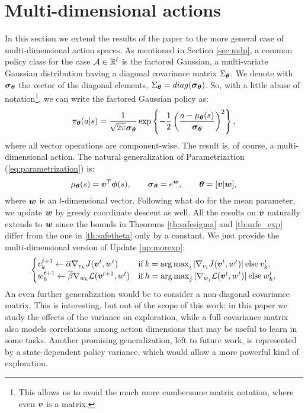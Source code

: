 \chapter{Multi-dimensional actions}\label{app:multi}
In this section we extend the results of the paper to the more general case of multi-dimensional action spaces.
As mentioned in Section \ref{sec:mdp}, a common policy class for the case $\Aspace\in\mathbb{R}^l$ is the factored Gaussian, \ie a multi-variate Gaussian distribution having a diagonal covariance matrix $\Sigma_{\vtheta}$. We denote with $\vsigma_{\vtheta}$ the vector of the diagonal elements, \ie $\Sigma_{\vtheta} = \mathop{diag}(\vsigma_{\vtheta})$. So, with a little abuse of notation\footnote{This allows us to avoid the much more cumbersome matrix notation, where even $\vv$ is a matrix.}, we can write the factored Gaussian policy as:
\[
\pi_{\vtheta}(a\vert s) = \frac{1}{\sqrt{2\pi}\vsigma_{\vtheta}}\exp\left\{-\frac{1}{2}\left(\frac{a - \mu_{\vtheta}(s)}{\vsigma_{\vtheta}}\right)^2\right\},
\]
where all vector operations are component-wise. The result is, of course, a multi-dimensional action. The natural generalization of Parametrization (\ref{eq:parametrization}) is:
\begin{align}\label{eq:parametrization_multi}
\mu_{\vtheta}(s)=\vv^T\vphi(s), \qquad \vsigma_{\vtheta}=e^{\vw}, \qquad \vtheta=[\vv\vert \vw],
\end{align}
where $\vw$ is an $l$-dimensional vector. Following what \cite{adaptive_batch} do for the mean parameter, we update $\vw$ by greedy coordinate descent as well. All the results on $\vv$ naturally extends to $\vw$ since the bounds in Theorems \ref{th:safesigma} and \ref{th:safe_exp} differ from the one in \ref{th:safetheta} only by a constant. We just provide the multi-dimensional version of Update \ref{up:morexp}:
\begin{align*}
\begin{cases}
v_{k}^{t+1} \gets \overline{\alpha}\gradJ[v_{k}]{\vv^t,w^t}
& \text{if}\:k =  \argmax_i |\gradJ[v_i]{\vv^t, w^t}| \:\text{else}\:v_{k}^t,\\
w_h^{t+1} \gets \overline{\beta}\nabla_{w_h}\mathcal{L}(\vv^{t+1}, w^t)
& \text{if}\:h =  \argmax_j |\nabla_{w_j}\mathcal{L}(\vv^t, w^t)| \:\text{else}\:w_{h}^t.
\end{cases}
\end{align*}
An even further generalization would be to consider a non-diagonal covariance matrix. This is interesting, but out of the scope of this work: in this paper we study the effects of the variance on exploration, while a full covariance matrix also models correlations among action dimensions that may be useful to learn in some tasks.
Another promising generalization, left to future work, is represented by a state-dependent policy variance, which would allow a more powerful kind of exploration.
